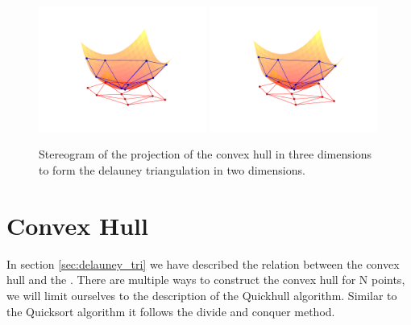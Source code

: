 \begin{figure}[htbp] %
   \centering
   \includegraphics[width=0.49\textwidth]{chapter_ndinterp/plots/delauney_project_left.pdf} 
   \hspace{-1.5cm}
   \includegraphics[width=0.49\textwidth]{chapter_ndinterp/plots/delauney_project_right.pdf} 
   \caption{Stereogram \citep[produced using a method described in ][]{Vogt11} of the projection of the convex hull in three dimensions to form the delauney triangulation in two dimensions.}
   \label{fig:delauney_projection}
\end{figure}

\section{Convex Hull}
In section \ref{sec:delauney_tri} we have described the relation between the convex hull  and the \deltri. There are multiple ways to construct the convex hull for N points, we will limit ourselves to the description of the Quickhull algorithm. Similar to the Quicksort algorithm it follows the divide and conquer method. 


